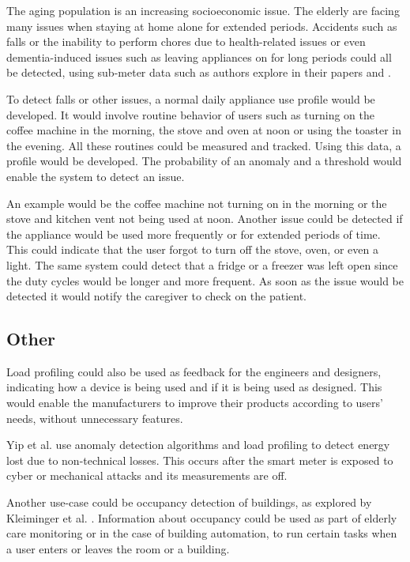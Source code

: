 The aging population is an increasing socioeconomic issue.
The elderly are facing many issues when staying at home alone for extended periods.
Accidents such as falls or the inability to perform chores due to health-related issues or even dementia-induced issues 
such as leaving appliances on for long periods could all be detected, using sub-meter data such as authors explore in their papers \cite{elder1} and \cite{elder2}.

To detect falls or other issues, a normal daily appliance use profile would be developed.
It would involve routine behavior of users such as turning on the coffee machine in the morning, the stove and oven at noon or using the toaster in the evening.
All these routines could be measured and tracked. Using this data, a profile would be developed.
The probability of an anomaly and a threshold would enable the system to detect an issue.

An example would be the coffee machine not turning on in the morning or the stove and kitchen vent not being used at noon.
Another issue could be detected if the appliance would be used more frequently or for extended periods of time. 
This could indicate that the user forgot to turn off the stove, oven, or even a light. The same system could detect 
that a fridge or a freezer was left open since the duty cycles would be longer and more frequent. 
As soon as the issue would be detected it would notify the caregiver to check on the patient.

\subsection{Other}

Load profiling could also be used as feedback for the engineers and designers,
indicating how a device is being used and if it is being used as designed. 
This would enable the manufacturers to improve their products according to 
users' needs, without unnecessary features.

Yip et al.\cite{energyStealing2018} use anomaly detection algorithms and load profiling to detect energy lost due to non-technical losses.
This occurs after the smart meter is exposed to cyber or mechanical attacks and its measurements are off. 

Another use-case could be occupancy detection of buildings, as explored by Kleiminger et al. \cite{occupancy2013}. 
Information about occupancy could be used as part of elderly care monitoring or in the case of building
automation, to run certain tasks when a user enters or leaves the room or a building.

